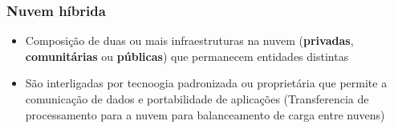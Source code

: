 \begin{frame}
	\frametitle{Nuvem híbrida}
	\begin{itemize}
		\item Composição de duas ou mais infraestruturas na nuvem (\textbf{privadas}, \textbf{comunitárias} ou \textbf{públicas}) que permanecem entidades distintas
		\item São interligadas por tecnoogia padronizada ou proprietária que permite a comunicação de dados e portabilidade de aplicações (Transferencia de processamento para a nuvem para balanceamento de carga entre nuvens)
	\end{itemize}
\end{frame}

